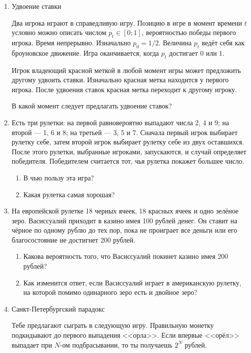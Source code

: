 \documentclass[nobib]{tufte-handout}
\begin{document}
\begin{enumerate}
\item Удвоение ставки 

Два игрока играют в справедливую игру. Позицию в игре в момент времени $t$ условно можно описать числом $p_t \in [0;1]$, вероятностью победы первого игрока. Время непрерывно. Изначально $p_0=1/2$. Величина $p_t$ ведёт себя как броуновское движение. Игра оканчивается, когда $p_t$ достигает $0$ или $1$. 

Игрок владеющий красной меткой в любой момент игры может предложить другому удвоить ставки. Изначально красная метка находится у первого игрока. После удвоения ставок красная метка переходит к другому игроку.

В какой момент следует предлагать удвоение ставок?

\item Есть три рулетки:  на первой равновероятно выпадают числа 2, 4 и 9; на второй --- 1, 6 и 8; на третьей --- 3, 5 и 7. Сначала первый игрок выбирает рулетку себе, затем второй игрок выбирает рулетку себе из двух оставшихся. После этого рулетки, выбранные игроками, запускаются, и случай определяет победителя. Победителем считается тот, чья рулетка покажет большее число. 

\begin{enumerate}
\item В чью пользу эта игра? 
\item Какая рулетка самая хорошая?
\end{enumerate}

\item На европейской рулетке 18 черных ячеек, 18 красных ячеек и одно зелёное зеро. Васиссуалий приходит в казино имея 100 рублей денег. Он ставит на чёрное по одному рублю до тех пор, пока не проиграет все деньги или его благосостояние не достигнет 200 рублей.

\begin{enumerate}
\item Какова вероятность того, что Васиссуалий покинет казино имея 200 рублей?
\item Как изменится ответ, если Васиссуалий играет в американскую рулетку, на которой помимо одинарного зеро есть и двойное зеро?
\end{enumerate}

\item Санкт-Петербургский парадокс

Тебе предлагают сыграть в следующую игру. Правильную монетку подкидывают до первого выпадения <<орла>>. Если впервые <<орёл>> выпадает при $N$-ом подбрасывании, то ты получаешь $2^N$ рублей.


\end{enumerate}
\end{document}
